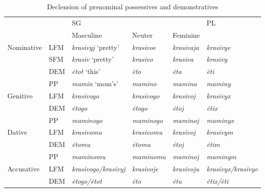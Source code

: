 \documentclass[output=paper,
colorlinks,
citecolor=brown,
newtxmath
]{langscibook}
\begin{document}
\begin{sidewaystable}\caption{Declension of prenominal possessives and demonstratives}
\label{tab1:paradigm}
\begin{tabularx}{\textwidth}{X|X|XXX|X} 
  \lsptoprule
    &            &                      SG                &            &                                    & PL\\
    &            &                      Masculine &                     Neuter    &         Feminine        &\\
  \midrule
  Nominative&     LFM         &       \textit{krasivyj} `pretty'    & \textit{krasivoe}   & \textit{krasivaja}   & \textit{krasivye}\\
  &     SFM         &       \textit{krasiv} `pretty'    & \textit{krasivo}   & \textit{krasiva}   & \textit{krasivy}\\
  &               DEM         &       \textit{ėtot} `this'        & \textit{ėto}       & \textit{ėta}       & \textit{ėti}\\
  &               PP          &       \textit{mamin} `mom's'       & \textit{mamino}    & \textit{mamina}    & \textit{maminy}\\
  \midrule 
  Genitive&       LFM         &       \textit{krasivogo}          & \textit{krasivogo} & \textit{krasivoj}  & \textit{krasivyx}\\
  &               DEM         &       \textit{ėtogo}              & \textit{ėtogo}     & \textit{ėtoj}      & \textit{ėtix}\\
  &               PP          &       \textit{maminogo}           & \textit{maminogo}  & \textit{maminoj}   & \textit{maminyx}\\
  \midrule
  Dative&         LFM         &       \textit{krasivomu}          & \textit{krasivomu} & \textit{krasivoj}  & \textit{krasivym}\\
  &               DEM         &       \textit{ėtomu}              & \textit{ėtomu}     & \textit{ėtoj}      & \textit{ėtim}\\
  &               PP          &       \textit{maminomu}           & \textit{maminomu}  & \textit{maminoj}   & \textit{maminym}\\
  \midrule
  Accusative&     LFM         &       \textit{krasivogo/krasivyj} & \textit{krasivoje} & \textit{krasivoju} & \textit{krasivyx/krasivye}\\
  &               DEM         &       \textit{ėtogo/ėtot}         & \textit{ėto}       & \textit{ėtu}       & \textit{ėtix/ėti}\\

\end{tabularx}
\end{sidewaystable}
\end{document}
